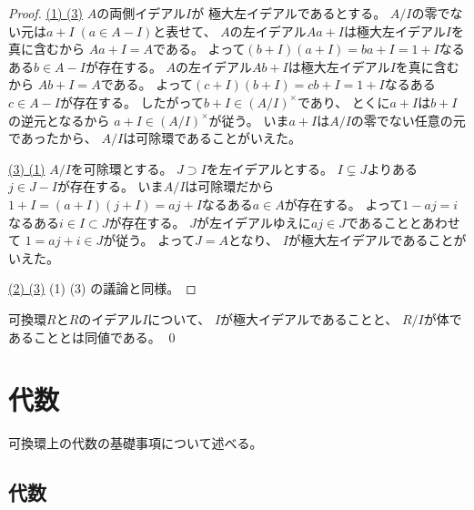 \documentclass[report]{jlreq}
\begin{document}
\begin{proof}
    \uline{(1) \Rightarrow (3)} \quad
    $A$の両側イデアル$I$が
    極大左イデアルであるとする。
    $A / I$の零でない元は$a + I \; (a \in A - I)$と表せて、
    $A$の左イデアル$Aa + I$は極大左イデアル$I$を真に含むから
    $Aa + I = A$である。
    よって$(b + I)(a + I) = ba + I = 1 + I$なるある$b \in A - I$が存在する。
    $A$の左イデアル$Ab + I$は極大左イデアル$I$を真に含むから
    $Ab + I = A$である。
    よって$(c + I)(b + I) = cb + I = 1 + I$なるある$c \in A - I$が存在する。
    したがって$b + I \in (A / I)^\times$であり、
    とくに$a + I$は$b + I$の逆元となるから
    $a + I \in (A / I)^\times$が従う。
    いま$a + I$は$A / I$の零でない任意の元であったから、
    $A / I$は可除環であることがいえた。

    \uline{(3) \Rightarrow (1)} \quad
    $A / I$を可除環とする。
    $J \supset I$を左イデアルとする。
    $I \subsetneq J$よりある$j \in J - I$が存在する。
    いま$A / I$は可除環だから
    $1 + I = (a + I)(j + I) = aj + I$なるある$a \in A$が存在する。
    よって$1 - aj = i$なるある$i \in I \subset J$が存在する。
    $J$が左イデアルゆえに$aj \in J$であることとあわせて
    $1 = aj + i \in J$が従う。
    よって$J = A$となり、
    $I$が極大左イデアルであることがいえた。

    \uline{(2) \Leftrightarrow (3)} \quad
    (1) \Leftrightarrow (3) の議論と同様。
\end{proof}

\begin{corollary}
    可換環$R$と$R$のイデアル$I$について、
    $I$が極大イデアルであることと、
    $R/I$が体であることとは同値である。
    \qed
\end{corollary}






%
\chapter{代数}

可換環上の代数の基礎事項について述べる。

%
\section{代数}
\end{document}

